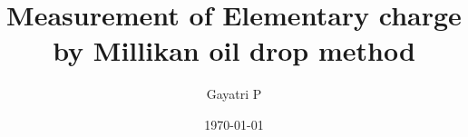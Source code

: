 \documentclass[reprint,amsmath,amssymb,aps, margin=1in]{revtex4-2}
\begin{document}
    \title{Measurement of Elementary charge\\by Millikan oil drop method}

    \author{Gayatri P}
    \date{\today}

    
    \maketitle

    
    
    
    
    

    
    \nocite{*}
\end{document}
